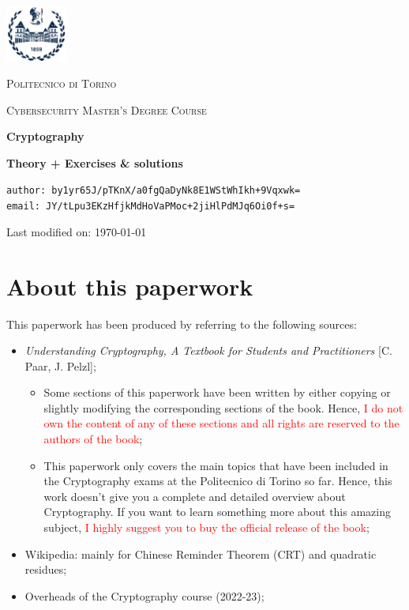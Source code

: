 \documentclass[11pt, a4paper]{article}
\author{by1yr65J/pTKnX/a0fgQaDyNk8E1WStWhIkh+9Vqxwk=}
\date{\today}
\begin{document}
\begin{titlepage}
	\centering
	\includegraphics[width=0.15\textwidth]{utili/PoliTo logo.jpg}\par\vspace{1cm}
	{\scshape\LARGE Politecnico di Torino \par}
	\vspace{1cm}
	{\scshape\Large Cybersecurity Master's Degree Course\par}
	\vspace{6cm}
	{\huge\bfseries Cryptography\par}
	\vspace{0.6cm}
	{\large\bfseries Theory + Exercises \& solutions\par}
	\vfill
    {\texttt{author: by1yr65J/pTKnX/a0fgQaDyNk8E1WStWhIkh+9Vqxwk=}\\\texttt{email: JY/tLpu3EKzHfjkMdHoVaPMoc+2jiHlPdMJq6Oi0f+s=}\\\vspace{0.5cm}\large{Last modified on: \today\par}}
\end{titlepage}

\graphicspath{{./images/}}

\newpage
\section*{About this paperwork}
This paperwork has been produced by referring to the following sources:
\begin{itemize}
    \item \textit{Understanding Cryptography, A Textbook for Students and Practitioners} [C. Paar, J. Pelzl];
    \begin{itemize}
        \item Some sections of this paperwork have been written by either copying or slightly modifying the corresponding sections of the book. Hence, \textcolor{red}{I do not own the content of any of these sections and all rights are reserved to the authors of the book};
        \item This paperwork only covers the main topics that have been included in the Cryptography exams at the Politecnico di Torino so far. Hence, this work doesn't give you a complete and detailed overview about Cryptography. If you want to learn something more about this amazing subject, \textcolor{red}{I highly suggest you to buy the official release of the book};
    \end{itemize}
    \item Wikipedia: mainly for Chinese Reminder Theorem (CRT) and quadratic residues;
    \item Overheads of the Cryptography course (2022-23);
\end{itemize}
\end{document}
